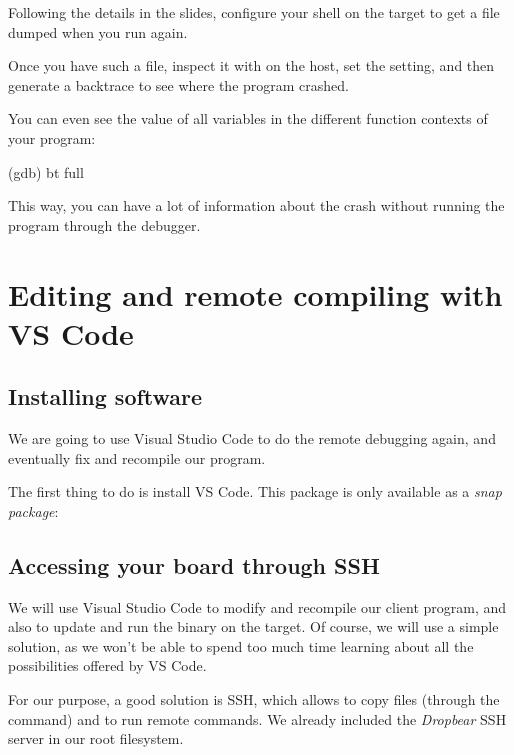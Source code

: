 Following the details in the slides, configure your shell on the
target to get a  file dumped when you run
 again.

Once you have such a file, inspect it with  on
the host, set the  setting, and then generate
a backtrace to see where the program crashed.

You can even see the value of all variables in the different
function contexts of your program:

\begin{bashinput}
(gdb) bt full
\end{bashinput}

This way, you can have a lot of information about the crash
without running the program through the debugger.

\section{Editing and remote compiling with VS Code}

\subsection{Installing software}

We are going to use Visual Studio Code to do the remote debugging
again, and eventually fix and recompile our program.

The first thing to do is install VS Code. This package is only available
as a {\em snap package}:


\subsection{Accessing your board through SSH}

We will use Visual Studio Code to modify and recompile our client
program, and also to update and run the binary on the target.
Of course, we will use a simple solution, as we won't be able to
spend too much time learning about all the possibilities offered
by VS Code.

For our purpose, a good solution is SSH, which allows to copy files
(through the  command) and to run remote commands. We already
included the {\em Dropbear} SSH server in our root filesystem.

